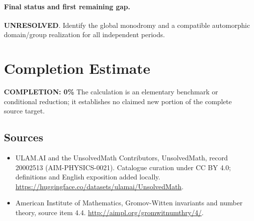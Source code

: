 \documentclass[11pt]{article}
\begin{document}
\paragraph{Final status and first remaining gap.}
\textbf{UNRESOLVED}. Identify the global monodromy and a compatible automorphic domain/group realization for all independent periods.

\section{Completion Estimate}
\noindent\textbf{COMPLETION: 0\%}
The calculation is an elementary benchmark or conditional reduction; it establishes no claimed new portion of the complete source target.

\subsection{Sources}
\begin{itemize}
\item[\hypertarget{source:20002513:1}{S1}] ULAM.AI and the UnsolvedMath Contributors, UnsolvedMath, record 20002513 (AIM-PHYSICS-0021). Catalogue curation under CC BY 4.0; definitions and English exposition added locally.
\url{https://huggingface.co/datasets/ulamai/UnsolvedMath}.
\item[\hypertarget{source:20002513:2}{S2}] American Institute of Mathematics, Gromov-Witten invariants and number theory, source item 4.4.
\url{http://aimpl.org/gromwitnumthry/4/}.
\end{itemize}
\label{end:20002513}
\end{document}
